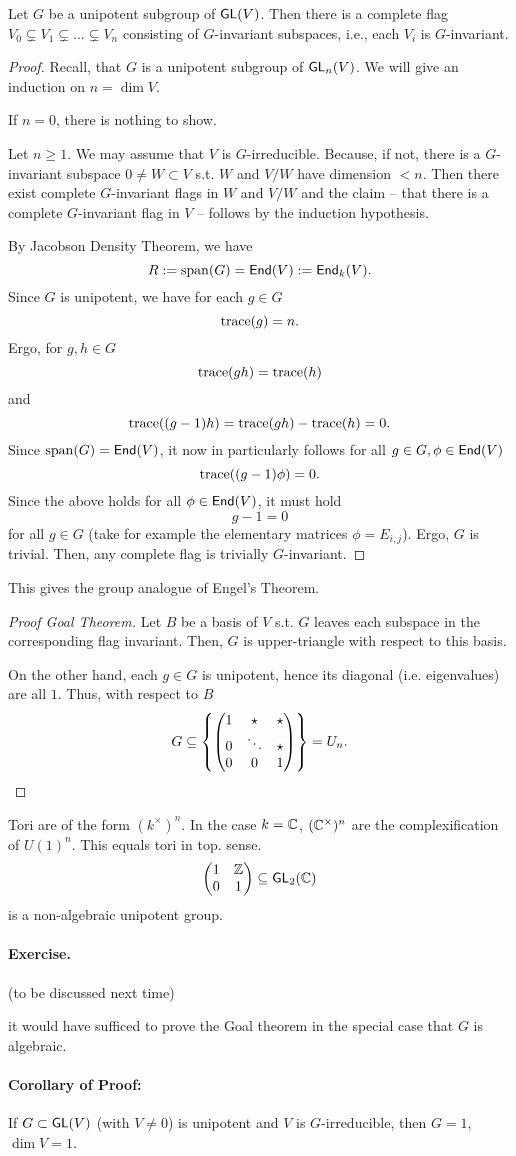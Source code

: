 \begin{proposition}
	Let $G$ be a unipotent subgroup of $\textsf{GL}(V)$. Then there is a complete flag $ V_0 \subsetneq V_1 \subsetneq \ldots \subsetneq V_n$ consisting of $G$-invariant subspaces, i.e., each $V_i$ is $G$-invariant.
\end{proposition}
\begin{proof}
Recall, that $G$ is a unipotent subgroup of $\textsf{GL}_n(V)$. We will give an induction on $n = \dim V$.

If $n = 0$, there is nothing to show.

Let $n \geq 1$. We may assume that $V$ is $G$-irreducible. Because, if not, there is a $G$-invariant subspace $0\neq W \subset V$ s.t. $W$ and $V/W$ have dimension $< n$. Then there exist complete $G$-invariant flags in $W$ and $V/W$ and the claim -- that there is a complete $G$-invariant flag in $V$ -- follows by the induction hypothesis.

By Jacobson Density Theorem, we have
\[ R := \mathrm{span}(G) = \textsf{End}(V) := \textsf{End}_k(V). \]
Since $G$ is unipotent, we have for each $g \in G$
\[ \mathrm{trace}(g) = n.\]
Ergo, for $g,h \in G$
\[ \mathrm{trace}(gh) = \mathrm{trace}(h) \]
and
\[ \mathrm{trace}((g-1)h) = \mathrm{trace}(gh) - \mathrm{trace}(h) = 0. \]
Since $\mathrm{span}(G) = \textsf{End}(V)$, it now in particularly follows for all $g \in G, \phi \in \textsf{End}(V)$
\[ \mathrm{trace}((g-1) \phi) = 0. \]
Since the above holds for all $\phi \in \textsf{End}(V)$, it must hold
\[ g-1 = 0 \]
for all $g \in G$ (take for example the elementary matrices $\phi = E_{i,j}$). Ergo, $G$ is trivial. Then, any complete flag is trivially $G$-invariant.
\end{proof}
\begin{remark}
	This gives the group analogue of Engel's Theorem.
\end{remark}
\begin{proof}[Proof Goal Theorem]
	Let $B$ be a basis of $V$ s.t. $G$ leaves each subspace in the corresponding flag invariant. Then, $G$ is upper-triangle with respect to this basis.
	
	On the other hand, each $g \in G$ is unipotent, hence its diagonal (i.e. eigenvalues) are all $1$. Thus, with respect to $B$
	\[ G \subseteq \left\lbrace
	\left(\begin{matrix} 1 & \star & \star\\ 0 & \ddots & \star \\ 0 & 0 & 1 \end{matrix}\right)\right\rbrace = U_n.\]
\end{proof}
\begin{remark}
	Tori are of the form $(k^\times)^n$. In the case $k = \mathbb{C}$, $(\mathbb{C}^\times)^n$ are the complexification of $U(1)^n$. This equals tori in top. sense.
	\[
	\left(\begin{matrix} 1 & \mathbb{Z} \\ 0 & 1 \end{matrix}\right) \subseteq \textsf{GL}_2(\mathbb{C})
	 \]
	 is a non-algebraic unipotent group.
\end{remark}
\paragraph{Exercise.} (to be discussed next time)

it would have sufficed to prove the Goal theorem in the special case that $G$ is algebraic.


\paragraph{Corollary of Proof:} If $G \subset \textsf{GL}(V)$ (with $V \neq 0$) is unipotent and $V$ is $G$-irreducible, then $G = 1$, $\dim V = 1$.
